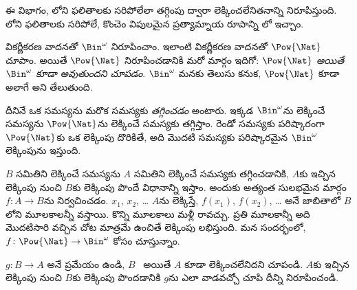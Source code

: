 \documentclass[../../../include/open-logic-section]{subfiles}
\begin{document}


\begin{editorial}
  ఈ విభాగం, లోని ఫలితాలకు సరిపోలేలా తగ్గింపు
  ద్వారా లెక్కించలేనితనాన్ని నిరూపిస్తుంది. లోని
  ఫలితాలకు సరిపోలే, కొంచెం విపులమైన ప్రత్యామ్నాయ రూపాన్ని
  లో ఇచ్చాం.
\end{editorial}

వికర్ణీకరణ వాదనతో $\Bin^\omega$  నిరూపించాం.
ఇలాంటి వికర్ణీకరణ వాదనతో $\Pow{\Nat}$  చూపాం.
అయితే $\Pow{\Nat}$  నిరూపించడానికి మరో మార్గం
ఇదిగో: \emph{$\Pow{\Nat}$  అయితే $\Bin^\omega$ కూడా
 అవుతుందని చూపడం}. $\Bin^\omega$ 
మనకు తెలుసు కనుక, $\Pow{\Nat}$ కూడా అలాగే అని తేలుతుంది.

దీనినే ఒక సమస్యను మరొక సమస్యకు \emph{తగ్గించడం} అంటారు. ఇక్కడ
$\Bin^\omega$ను లెక్కించే సమస్యను $\Pow{\Nat}$ను లెక్కించే సమస్యకు
తగ్గిస్తాం. రెండో సమస్యకు పరిష్కారంగా $\Pow{\Nat}$కు ఒక లెక్కింపు దొరికితే,
అది మొదటి సమస్యకు పరిష్కారమైన $\Bin^\omega$ లెక్కింపును ఇస్తుంది.

$B$ సమితిని లెక్కించే సమస్యను $A$ సమితిని లెక్కించే సమస్యకు తగ్గించడానికి,
$A$కు ఇచ్చిన లెక్కింపు నుంచి $B$కు లెక్కింపు పొందే విధానాన్ని ఇస్తాం.
అందుకు అత్యంత సులభమైన మార్గం  $f\colon A \to B$ను
నిర్వచించడం. $x_1$, $x_2$, \dots{} $A$ను లెక్కిస్తే, $f(x_1)$,
$f(x_2)$, \dots{} అనే జాబితాలో $B$లోని మూలకాలన్నీ వస్తాయి. కొన్ని మూలకాలు మళ్లీ రావచ్చు. ప్రతి మూలకాన్నీ అది మొదటిసారి వచ్చిన చోట మాత్రమే ఉంచితే లెక్కింపు లభిస్తుంది. మన సందర్భంలో, 
$f\colon \Pow{\Nat} \to \Bin^\omega$ కోసం చూస్తున్నాం.

\begin{prob}
$g\colon B \to A$ అనే  ప్రమేయం ఉండి, $B$~
అయితే $A$ కూడా లెక్కించలేనిదని చూపండి. $A$కు ఇచ్చిన లెక్కింపు నుంచి
$B$కు లెక్కింపు పొందడానికి $g$ను ఎలా వాడవచ్చో చూపి దీన్ని
నిరూపించండి.
\end{prob}
\end{document}
